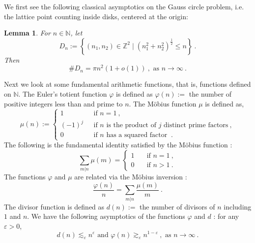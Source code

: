 \documentclass[12pt]{amsart}
\newtheorem{lemma}[theorem]{Lemma}
\theoremstyle{definition}
\newcommand{\Z}{\mathbb Z}%
\newcommand{\N}{\mathbb N}%
\numberwithin{equation}{section}
\begin{document}
We first see the following classical asymptotics on the Gauss circle problem, i.e. the lattice point counting inside disks, centered at the origin:
\begin{lemma} \label{lattice_point_counting} For $n \in \N$, let $$D_n:= \left\{(n_1,n_2) \in \Z^2 \mid \left(n^2_1 + n^2_2\right)^\frac{1}{2} \le n\right\}\:.$$ Then 
$$\#D_n = \pi n^2 (1+o(1))\:,\text{ as } n \to \infty\:.$$
\end{lemma}
Next we look at some fundamental arithmetic functions, that is, functions defined on $\N$. The Euler's totient function $\varphi$ is defined as $\varphi(n):=$ the number of positive integers less than and prime to $n$. The M\"obius function $\mu$ is defined as,
\begin{equation*}
\mu(n):=\begin{cases}
1\:\:\:&\text{if } n=1\:,\\
{(-1)}^j\:\:\:&\text{if } n \text{ is the product of } j \text{ distinct prime factors}\:, \\
0\:\:\:&\text{if } n \text{ has a squared factor }\:.
\end{cases}
\end{equation*} 
The following is the fundamental identity satisfied by the M\"obius function \cite[Theorem 263]{Hardy}:
\begin{equation} \label{mobius_identity}
\sum_{m|n} \mu(m) =\begin{cases}
1\:\:\:&\text{ if } n=1\:,\\
0\:\:\:&\text{ if } n>1\:.
\end{cases}
\end{equation}
The functions $\varphi$ and $\mu$ are related via the M\"obius inversion \cite[Eqn. 16.3.1]{Hardy}:
\begin{equation} \label{mobius_inversion}
\frac{\varphi(n)}{n}= \sum_{m|n} \frac{\mu(m)}{m}\:.
\end{equation}
The divisor function is defined as $d(n):=$ the number of divisors of $n$ including $1$ and $n$.
We have the following asymptotics of the functions $\varphi$ and $d$ \cite[Theorems 315 and 327]{Hardy}: for any $\varepsilon>0$,
\begin{equation} \label{asymptotics}
d(n) \lesssim_{\varepsilon} n^\varepsilon \text{ and } \varphi(n) \gtrsim_{\varepsilon} n^{1-\varepsilon}\:,\text{ as } n \to \infty\:.
\end{equation}
\end{document}
